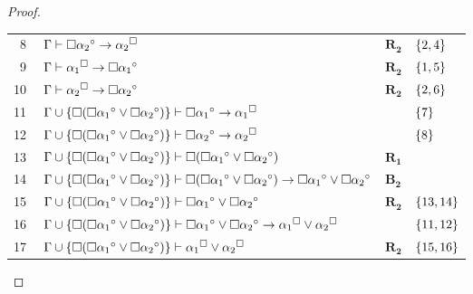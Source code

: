 \begin{tcolorbox}[enhanced jigsaw, breakable, sharp corners, colframe=black, colback=white, boxrule=0.5pt, left=1.5mm, right=1.5mm, top=1.5mm, bottom=1.5mm]
\begin{theorem}
\begin{proof}
\begin{xltabular}{\textwidth}{r | X l l}
            \scriptsize{\phantom{0}8}\phantom{ } & $\ \Gamma \vdash \Box{\alpha_2}^\circ \to {\alpha_2}^\Box$ & $\hyperref[modal.rule.2]{\mathbf{R_2}}$ & $\left\{2,4\right\}$\\[\rowskip]
            \scriptsize{\phantom{0}9}\phantom{ } & $\ \Gamma \vdash {\alpha_1}^\Box \to \Box{\alpha_1}^\circ$ & $\hyperref[modal.rule.2]{\mathbf{R_2}}$ & $\left\{1,5\right\}$\\[\rowskip]
            \scriptsize{10}\phantom{ } & $\ \Gamma \vdash {\alpha_2}^\Box \to \Box{\alpha_2}^\circ$ & $\hyperref[modal.rule.2]{\mathbf{R_2}}$ & $\left\{2,6\right\}$\\[\rowskip]
            \scriptsize{11}\phantom{ } & $\ \Gamma \cup \left\{\Box(\Box{\alpha_1}^\circ \vee \Box{\alpha_2}^\circ)\right\} \vdash \Box{\alpha_1}^\circ \to {\alpha_1}^\Box$ &  & $\left\{7\right\}$\\[\rowskip]
            \scriptsize{12}\phantom{ } & $\ \Gamma \cup \left\{\Box(\Box{\alpha_1}^\circ \vee \Box{\alpha_2}^\circ)\right\} \vdash \Box{\alpha_2}^\circ \to {\alpha_2}^\Box$ &  & $\left\{8\right\}$\\[\rowskip]
            \scriptsize{13}\phantom{ } & $\ \Gamma \cup \left\{\Box(\Box{\alpha_1}^\circ \vee \Box{\alpha_2}^\circ)\right\} \vdash \Box(\Box{\alpha_1}^\circ \vee \Box{\alpha_2}^\circ)$ & $\hyperref[modal.rule.1]{\mathbf{R_1}}$ & \\[\rowskip]
            \scriptsize{14}\phantom{ } & $\ \Gamma \cup \left\{\Box(\Box{\alpha_1}^\circ \vee \Box{\alpha_2}^\circ)\right\} \vdash \Box(\Box{\alpha_1}^\circ \vee \Box{\alpha_2}^\circ) \to \Box{\alpha_1}^\circ \vee \Box{\alpha_2}^\circ$ & $\hyperref[modal.axiom.modal.2]{\mathbf{B_2}}$ & \\[\rowskip]
            \scriptsize{15}\phantom{ } & $\ \Gamma \cup \left\{\Box(\Box{\alpha_1}^\circ \vee \Box{\alpha_2}^\circ)\right\} \vdash \Box{\alpha_1}^\circ \vee \Box{\alpha_2}^\circ$ & $\hyperref[modal.rule.2]{\mathbf{R_2}}$ & $\left\{13,14\right\}$\\[\rowskip]
            \scriptsize{16}\phantom{ } & $\ \Gamma \cup \left\{\Box(\Box{\alpha_1}^\circ \vee \Box{\alpha_2}^\circ)\right\} \vdash \Box{\alpha_1}^\circ \vee \Box{\alpha_2}^\circ \to {\alpha_1}^\Box \vee {\alpha_2}^\Box$ &  & $\left\{11,12\right\}$\\[\rowskip]
            \scriptsize{17}\phantom{ } & $\ \Gamma \cup \left\{\Box(\Box{\alpha_1}^\circ \vee \Box{\alpha_2}^\circ)\right\} \vdash {\alpha_1}^\Box \vee {\alpha_2}^\Box$ & $\hyperref[modal.rule.2]{\mathbf{R_2}}$ & $\left\{15,16\right\}$\\[\rowskip]

\end{xltabular}
\end{proof}
\end{theorem}
\end{tcolorbox}
